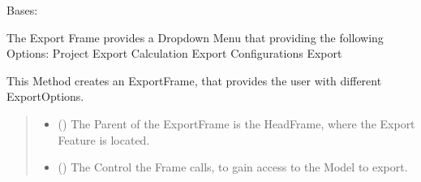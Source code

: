 \documentclass[letterpaper,10pt,english]{sphinxmanual}
\begin{document}
\begin{fulllineitems}
\label{\detokenize{apidoc/src.osm_configurator.view.utilityframes:src.osm_configurator.view.utilityframes.export_frame.ExportFrame}}
\pysigstartsignatures
{}
\pysigstopsignatures
\sphinxAtStartPar
Bases: 

\sphinxAtStartPar
The Export Frame provides a Dropdown Menu that providing the following Options:
\sphinxhyphen{} Project Export
\sphinxhyphen{} Calculation Export
\sphinxhyphen{} Configurations Export

\begin{fulllineitems}
\label{\detokenize{apidoc/src.osm_configurator.view.utilityframes:src.osm_configurator.view.utilityframes.export_frame.ExportFrame.__init__}}
\pysigstartsignatures
{}
\pysigstopsignatures
\sphinxAtStartPar
This Method creates an ExportFrame, that provides the user with different Export\sphinxhyphen{}Options.
\begin{quote}\begin{description}
\begin{itemize}
\item {} 
\sphinxAtStartPar
{} ({\hyperref[\detokenize{apidoc/src.osm_configurator.view.toplevelframes:src.osm_configurator.view.toplevelframes.project_head_frame.ProjectHeadFrame}]{}}) \textendash{} The Parent of the ExportFrame is the HeadFrame, where the Export Feature is located.

\item {} 
\sphinxAtStartPar
{} ({\hyperref[\detokenize{apidoc/src.osm_configurator.control:src.osm_configurator.control.control_interface.IControl}]{}}) \textendash{} The Control the Frame calls, to gain access to the Model to export.

\end{itemize}

\end{description}\end{quote}

\end{fulllineitems}


\end{fulllineitems}
\end{document}
